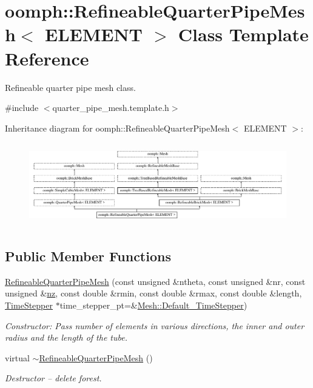 \hypertarget{classoomph_1_1RefineableQuarterPipeMesh}{}\section{oomph\+:\+:Refineable\+Quarter\+Pipe\+Mesh$<$ E\+L\+E\+M\+E\+NT $>$ Class Template Reference}
\label{classoomph_1_1RefineableQuarterPipeMesh}


Refineable quarter pipe mesh class.  




{\ttfamily \#include $<$quarter\+\_\+pipe\+\_\+mesh.\+template.\+h$>$}

Inheritance diagram for oomph\+:\+:Refineable\+Quarter\+Pipe\+Mesh$<$ E\+L\+E\+M\+E\+NT $>$\+:\begin{figure}[H]
\begin{center}
\leavevmode
\includegraphics[height=3.672131cm]{classoomph_1_1RefineableQuarterPipeMesh}
\end{center}
\end{figure}
\subsection*{Public Member Functions}
\begin{DoxyCompactItemize}
\item 
\hyperlink{classoomph_1_1RefineableQuarterPipeMesh_ac4b3f592279a2437487ddce284b406a6}{Refineable\+Quarter\+Pipe\+Mesh} (const unsigned \&ntheta, const unsigned \&nr, const unsigned \&\hyperlink{classoomph_1_1SimpleCubicMesh_ad78725440e4e87598fd9339653b28e61}{nz}, const double \&rmin, const double \&rmax, const double \&length, \hyperlink{classoomph_1_1TimeStepper}{Time\+Stepper} $\ast$time\+\_\+stepper\+\_\+pt=\&\hyperlink{classoomph_1_1Mesh_a12243d0fee2b1fcee729ee5a4777ea10}{Mesh\+::\+Default\+\_\+\+Time\+Stepper})
\begin{DoxyCompactList}\small\item\em Constructor\+: Pass number of elements in various directions, the inner and outer radius and the length of the tube. \end{DoxyCompactList}\item 
virtual \hyperlink{classoomph_1_1RefineableQuarterPipeMesh_ad2015da2ae7382f3fe2c3a088f4fa021}{$\sim$\+Refineable\+Quarter\+Pipe\+Mesh} ()
\begin{DoxyCompactList}\small\item\em Destructor -- delete forest. \end{DoxyCompactList}\end{DoxyCompactItemize}
